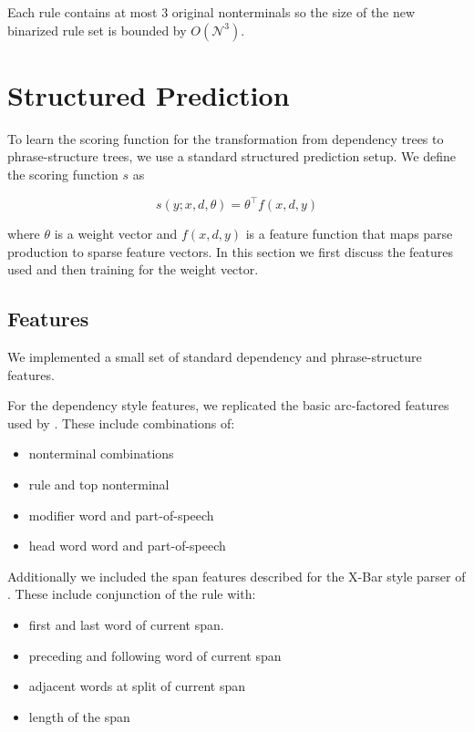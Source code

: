 \documentclass[11pt,letterpaper]{article}
\newcommand{\nonterms}{\mathcal{N}}
\begin{document}
\begin{center}
\end{center}

\noindent Each rule contains at most 3 original nonterminals so the size of the new binarized rule set is bounded by $O(\nonterms^3)$.



\section{Structured Prediction}

To learn the scoring function for the transformation from dependency trees to phrase-structure trees,
we use a standard structured prediction setup.
We define the scoring function $s$ as

\[s(y;x, d, \theta) =  \theta^{\top} f(x, d, y) \]

\noindent
where $\theta$ is a weight vector  and $f(x, d, y)$ is a feature function that maps parse production to sparse feature vectors. In this section we first discuss the features used and then training for the weight vector.


\subsection{Features}

We implemented a small set of standard dependency and phrase-structure features.

For the dependency style features, we replicated the basic arc-factored features
used by . These include combinations of:

\begin{itemize}
\item nonterminal combinations
\item rule and top nonterminal
\item modifier word and part-of-speech
\item head word word and part-of-speech
\end{itemize}

Additionally we included the span features described for the X-Bar style
parser of . These include conjunction of the rule
with:

\begin{itemize}
\item first and last word of current span.
\item preceding and following word of current span
\item adjacent words at split of current span
\item length of the span
\end{itemize}
\end{document}
